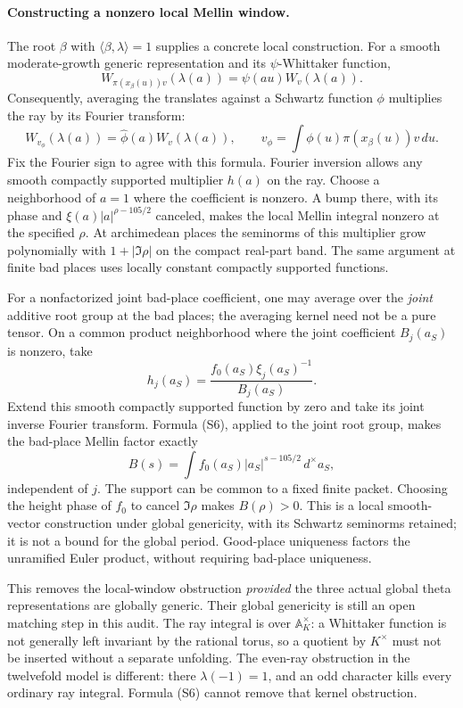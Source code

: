 \documentclass[11pt]{article}
\begin{document}
\paragraph{Constructing a nonzero local Mellin window.}
The root \(\beta\) with \(\langle\beta,\lambda\rangle=1\) supplies a
concrete local construction. For a smooth moderate-growth generic
representation and its \(\psi\)-Whittaker function,
\[
 W_{\pi(x_\beta(u))v}(\lambda(a))
       =\psi(au)W_v(\lambda(a)).
\]
Consequently, averaging the translates against a Schwartz function
\(\phi\) multiplies the ray by its Fourier transform:
\[
 W_{v_\phi}(\lambda(a))=\widehat\phi(a)W_v(\lambda(a)),
 \qquad v_\phi=\int\phi(u)\pi(x_\beta(u))v\,du .
 \tag{S6}\label{eq:ray-window}
\]
Fix the Fourier sign to agree with this formula. Fourier inversion
allows any smooth compactly supported multiplier \(h(a)\) on the
ray. Choose a neighborhood of \(a=1\) where the coefficient is
nonzero. A bump there, with its phase and
\(\xi(a)|a|^{\rho-105/2}\) canceled, makes the local Mellin integral
nonzero at the specified \(\rho\). At archimedean places the
seminorms of this multiplier grow polynomially with
\(1+|\Im\rho|\) on the compact real-part band. The same argument at
finite bad places uses locally constant compactly supported functions.

For a nonfactorized joint bad-place coefficient, one may average
over the \emph{joint} additive root group at the bad places; the
averaging kernel need not be a pure tensor. On a common product
neighborhood where the joint coefficient \(B_j(a_S)\) is nonzero,
take
\[
 h_j(a_S)=\frac{f_0(a_S)\xi_j(a_S)^{-1}}{B_j(a_S)}.
\]
Extend this smooth compactly supported function by zero and take its
joint inverse Fourier transform. Formula (S6), applied to the joint
root group, makes the bad-place Mellin factor exactly
\[
 B(s)=\int f_0(a_S)|a_S|^{s-105/2}\,d^\times a_S,
\]
independent of \(j\). The support can be common to a fixed finite
packet. Choosing the height phase of \(f_0\) to cancel \(\Im\rho\)
makes \(B(\rho)>0\). This is a local smooth-vector construction under
global genericity, with its Schwartz seminorms retained; it is not
a bound for the global period. Good-place uniqueness factors the
unramified Euler product, without requiring bad-place uniqueness.

This removes the local-window obstruction \emph{provided} the three
actual global theta representations are globally generic.
Their global genericity is still an open matching step in this audit.
The ray integral is over \(\mathbb A_K^\times\): a Whittaker function
is not generally left invariant by the rational torus, so a quotient
by \(K^\times\) must not be inserted without a separate unfolding.
The even-ray obstruction in the twelvefold model is different:
there \(\lambda(-1)=1\), and an odd character kills every ordinary
ray integral. Formula (S6) cannot remove that kernel obstruction.
\end{document}
